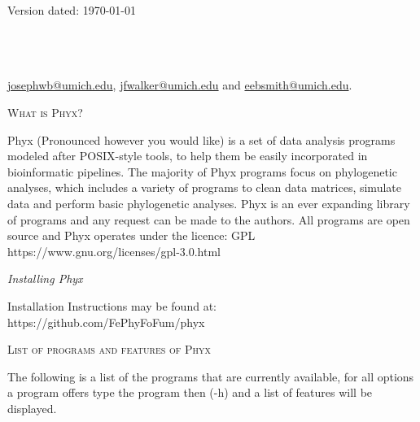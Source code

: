 \documentclass[12pt,letterpaper]{article}
\renewcommand{\section}[1]{%
\bigskip
\begin{center}
\begin{Large}
\normalfont\scshape #1
\medskip
\end{Large}
\end{center}}
\renewcommand{\subsection}[1]{%
\bigskip
\begin{center}
\begin{large}
\normalfont\itshape #1
\end{large}
\end{center}}
\begin{document}
\begin{flushright}
Version dated: \today
\end{flushright}
\bigskip

\\
\\
\\

\medskip
{} \href{josephwb@umich.edu}{josephwb@umich.edu}, \href{jfwalker@umich.edu}{jfwalker@umich.edu} and \href{eebsmith@umich.edu}{eebsmith@umich.edu}.\\
\medskip

\vspace{1in}

\section{What is Phyx?}\label{abstract}
Phyx (Pronounced however you would like) is a set of data analysis programs modeled after POSIX-style tools, to help them be easily incorporated in bioinformatic pipelines. The majority of Phyx programs focus on phylogenetic analyses, which includes a variety of programs to clean data matrices, simulate data and perform basic phylogenetic analyses. Phyx is an ever expanding library of programs and any request can be made to the authors. 
All programs are open source and Phyx operates under the licence: GPL https://www.gnu.org/licenses/gpl-3.0.html

\subsection{Installing Phyx}\label{introduction}
\begin{flushleft}
Installation Instructions may be found at: https://github.com/FePhyFoFum/phyx

\end{flushleft}
\section{List of programs and features of Phyx}

The following is a list of the programs that are currently available, for all options a program offers type the program then (-h) and a list of features will be displayed.
\end{document}

